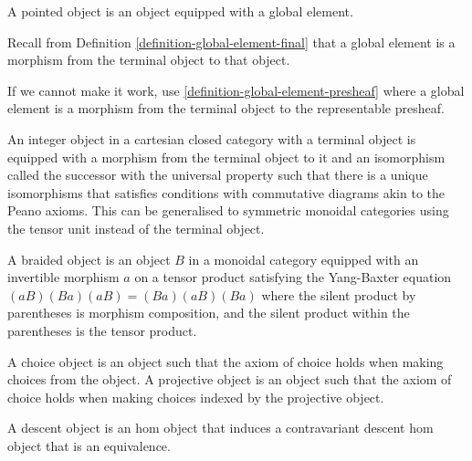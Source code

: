 \begin{definition}
    \label{definition-pointed-object}
    A pointed object is an object equipped with a global element.

    Recall from Definition \ref{definition-global-element-final} that a global element is a morphism from the terminal object to that object.

    If we cannot make it work, use \ref{definition-global-element-presheaf} where a global element is a morphism from the terminal object to the representable presheaf.
\end{definition}

\begin{definition}
    \label{definition-integer-object}
    An integer object in a cartesian closed category with a terminal object is equipped with a morphism from the terminal object to it and an isomorphism called the successor with the universal property such that there is a unique isomorphisms that satisfies conditions with commutative diagrams akin to the Peano axioms. This can be generalised to symmetric monoidal categories using the tensor unit instead of the terminal object.
\end{definition}

\begin{definition}
    \label{definition-braided-object}
    A braided object is an object $B$ in a monoidal category equipped with an invertible morphism $a$ on a tensor product satisfying the Yang-Baxter equation $(a B)(B a)(a B) = (B a)(a B)(B a)$ where the silent product by parentheses is morphism composition, and the silent product within the parentheses is the tensor product.
\end{definition}


\begin{definition}
    \label{definition-choice-object}
    A choice object is an object such that the axiom of choice holds when making choices from the object. A projective object is an object such that the axiom of choice holds when making choices indexed by the projective object.
\end{definition}

\begin{definition}
    \label{definition-descent-object}
    A descent object is an hom object that induces a contravariant descent hom object that is an equivalence.
\end{definition}

